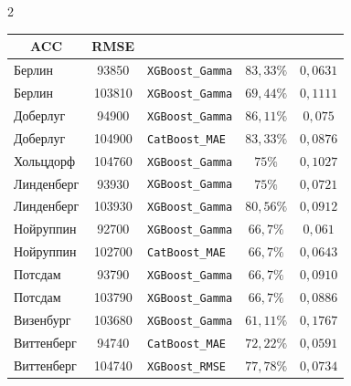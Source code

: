 \begin{multicols}{2}
\begin{table}[b]
\begin{center}
\begin{tabular}{|l|c|l|c|c|}
\multicolumn{1}{c|}{\bf ACC}& {\bf RMSE} \\

\hline

      Берлин &   \hphantom{9}93850 &  \verb"XGBoost_Gamma" &  $83{,}33\%$ &  $0{,}0631$ \\

      Берлин &  103810 &  \verb"XGBoost_Gamma" &  $69{,}44\%$ &  $0{,}1111$ \\

    Доберлуг &   \hphantom{9}94900 &  \verb"XGBoost_Gamma" &  $86{,}11\%$ &  $0{,}075$\hphantom{9} \\

    Доберлуг &  104900 &   \verb"CatBoost_MAE" &  $83{,}33\%$ &  $0{,}0876$ \\

    Хольцдорф&  104760 &  \verb"XGBoost_Gamma" &  $75\%$\hphantom{,99} &  $0{,}1027$ \\

  Линденберг &   \hphantom{9}93930 &  \verb"XGBoost_Gamma" & $ 75\%$\hphantom{,99} &  $0{,}0721$ \\

  Линденберг &  103930 &  \verb"XGBoost_Gamma" &  $80{,}56\%$ &  $0{,}0912$ \\

   Нойруппин &   \hphantom{9}92700 &  \verb"XGBoost_Gamma" &  $66{,}7\%$\hphantom{9} &  $0{,}061$\hphantom{9} \\

   Нойруппин &  102700 &   \verb"CatBoost_MAE" &  $66{,}7\%$\hphantom{9} &  $0{,}0643$ \\

     Потсдам &   \hphantom{9}93790 &  \verb"XGBoost_Gamma" & $66{,}7\%$\hphantom{9} &  $0{,}0910$ \\

     Потсдам &  103790 &  \verb"XGBoost_Gamma" &  $66{,}7\%$\hphantom{9} & $ 0{,}0886$ \\

  Визенбург &  103680 &  \verb"XGBoost_Gamma" & $ 61{,}11\%$ &  $0{,}1767$ \\

  Виттенберг &   \hphantom{9}94740 &   \verb"CatBoost_MAE" &  $72{,}22\%$ &  $0{,}0591$ \\

  Виттенберг &  104740 &   \verb"XGBoost_RMSE" &  $77{,}78\%$ &  $0{,}0734$ \\

\hline


\end{tabular}
\end{center}
\end{table}
\end{multicols}
